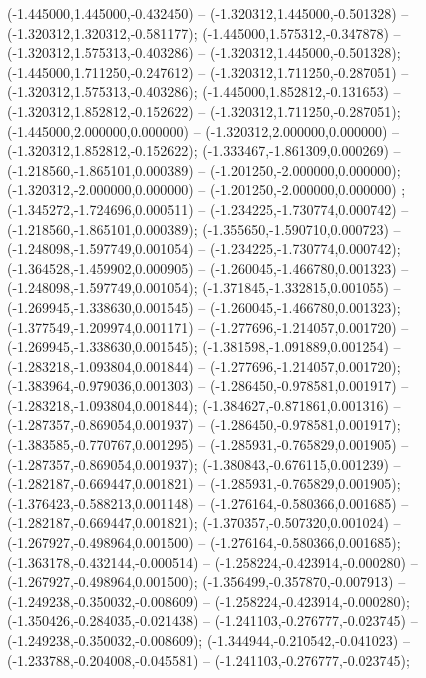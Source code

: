  (-1.445000,1.445000,-0.432450) -- (-1.320312,1.445000,-0.501328) -- (-1.320312,1.320312,-0.581177);
 (-1.445000,1.575312,-0.347878) -- (-1.320312,1.575313,-0.403286) -- (-1.320312,1.445000,-0.501328);
 (-1.445000,1.711250,-0.247612) -- (-1.320312,1.711250,-0.287051) -- (-1.320312,1.575313,-0.403286);
 (-1.445000,1.852812,-0.131653) -- (-1.320312,1.852812,-0.152622) -- (-1.320312,1.711250,-0.287051);
 (-1.445000,2.000000,0.000000) -- (-1.320312,2.000000,0.000000) -- (-1.320312,1.852812,-0.152622);
 (-1.333467,-1.861309,0.000269) -- (-1.218560,-1.865101,0.000389) -- (-1.201250,-2.000000,0.000000);
 (-1.320312,-2.000000,0.000000) -- (-1.201250,-2.000000,0.000000) ;
 (-1.345272,-1.724696,0.000511) -- (-1.234225,-1.730774,0.000742) -- (-1.218560,-1.865101,0.000389);
 (-1.355650,-1.590710,0.000723) -- (-1.248098,-1.597749,0.001054) -- (-1.234225,-1.730774,0.000742);
 (-1.364528,-1.459902,0.000905) -- (-1.260045,-1.466780,0.001323) -- (-1.248098,-1.597749,0.001054);
 (-1.371845,-1.332815,0.001055) -- (-1.269945,-1.338630,0.001545) -- (-1.260045,-1.466780,0.001323);
 (-1.377549,-1.209974,0.001171) -- (-1.277696,-1.214057,0.001720) -- (-1.269945,-1.338630,0.001545);
 (-1.381598,-1.091889,0.001254) -- (-1.283218,-1.093804,0.001844) -- (-1.277696,-1.214057,0.001720);
 (-1.383964,-0.979036,0.001303) -- (-1.286450,-0.978581,0.001917) -- (-1.283218,-1.093804,0.001844);
 (-1.384627,-0.871861,0.001316) -- (-1.287357,-0.869054,0.001937) -- (-1.286450,-0.978581,0.001917);
 (-1.383585,-0.770767,0.001295) -- (-1.285931,-0.765829,0.001905) -- (-1.287357,-0.869054,0.001937);
 (-1.380843,-0.676115,0.001239) -- (-1.282187,-0.669447,0.001821) -- (-1.285931,-0.765829,0.001905);
 (-1.376423,-0.588213,0.001148) -- (-1.276164,-0.580366,0.001685) -- (-1.282187,-0.669447,0.001821);
 (-1.370357,-0.507320,0.001024) -- (-1.267927,-0.498964,0.001500) -- (-1.276164,-0.580366,0.001685);
 (-1.363178,-0.432144,-0.000514) -- (-1.258224,-0.423914,-0.000280) -- (-1.267927,-0.498964,0.001500);
 (-1.356499,-0.357870,-0.007913) -- (-1.249238,-0.350032,-0.008609) -- (-1.258224,-0.423914,-0.000280);
 (-1.350426,-0.284035,-0.021438) -- (-1.241103,-0.276777,-0.023745) -- (-1.249238,-0.350032,-0.008609);
 (-1.344944,-0.210542,-0.041023) -- (-1.233788,-0.204008,-0.045581) -- (-1.241103,-0.276777,-0.023745);

